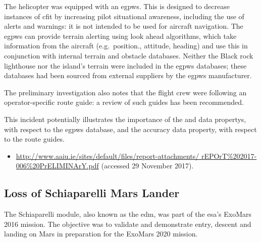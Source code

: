 The helicopter was equipped with an \gls{egpws}. This is designed to decrease instances of \gls{cfit} by increasing pilot situational awareness, including the use of alerts and warnings: it is not intended to be used for aircraft navigation. The \gls{egpws} can provide terrain alerting using look ahead algorithms, which take \gls{information} from the aircraft (e.g.\ position., attitude, heading) and use this in conjunction with internal terrain and obstacle \glspl{database}. Neither the Black rock lighthouse nor the island's terrain were included in the \gls{egpws} \glspl{database}; these \glspl{database} had been sourced from external suppliers by the \gls{egpws} manufacturer.

The preliminary investigation also notes that the flight crew were following an operator-specific route guide: a review of such guides has been recommended.

This incident potentially illustrates the importance of the  and  \glspl{data property}, with respect to the \gls{egpws} \gls{database}, and the \gls{accuracy} \gls{data property}, with respect to the route guides.

\begin{samepage}
\begin{itemize}
  \item \raggedright{\href{http://www.aaiu.ie/sites/default/files/report-attachments/rEPOrT\%202017-006\%20PrELIMINArY.pdf}{http://www.aaiu.ie/sites/default/files/report-attachments/ rEPOrT\%202017-006\%20PrELIMINArY.pdf} (accessed 29 November 2017).}
\end{itemize}
\end{samepage}


\subsection{Loss of Schiaparelli Mars Lander} \label{bkm:incacc:schiaparelli}
The Schiaparelli module, also known as the \gls{edm}, was part of the \gls{esa}'s ExoMars 2016 mission. The objective was to validate and demonstrate entry, descent and landing on Mars in preparation for the ExoMars 2020 mission.

